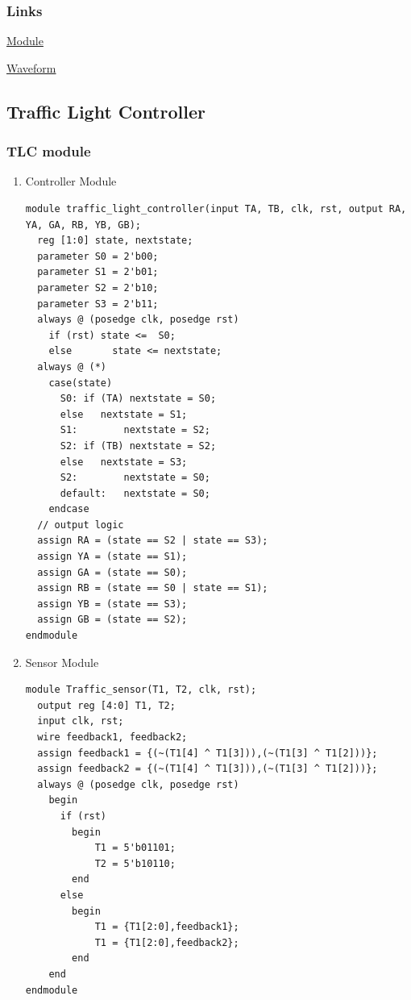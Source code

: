 \documentclass[11pt]{article}
\begin{document}
\subsubsection{Links}
\label{sec:org8eff037}

\href{https://www.edaplayground.com/x/3g3D}{Module}

\href{https://www.edaplayground.com/w/x/23g}{Waveform}
\subsection{Traffic Light Controller}
\label{sec:org4c664e3}
\subsubsection{TLC module}
\label{sec:orgbf96796}
\begin{enumerate}
\item Controller Module
\label{sec:orgc8b33d9}
\begin{verbatim}
module traffic_light_controller(input TA, TB, clk, rst, output RA, YA, GA, RB, YB, GB);
  reg [1:0] state, nextstate;
  parameter S0 = 2'b00;
  parameter S1 = 2'b01;
  parameter S2 = 2'b10;
  parameter S3 = 2'b11;
  always @ (posedge clk, posedge rst)
    if (rst) state <=  S0;
    else       state <= nextstate;
  always @ (*)
    case(state)
      S0: if (TA) nextstate = S0;
      else   nextstate = S1;
      S1:        nextstate = S2;
      S2: if (TB) nextstate = S2;
      else   nextstate = S3;
      S2:        nextstate = S0;
      default:   nextstate = S0;
    endcase
  // output logic
  assign RA = (state == S2 | state == S3);
  assign YA = (state == S1);
  assign GA = (state == S0);
  assign RB = (state == S0 | state == S1);
  assign YB = (state == S3);
  assign GB = (state == S2);
endmodule
\end{verbatim}
\item Sensor Module
\label{sec:orgf1755b3}
\begin{verbatim}
module Traffic_sensor(T1, T2, clk, rst);
  output reg [4:0] T1, T2;
  input clk, rst;
  wire feedback1, feedback2;
  assign feedback1 = {(~(T1[4] ^ T1[3])),(~(T1[3] ^ T1[2]))};
  assign feedback2 = {(~(T1[4] ^ T1[3])),(~(T1[3] ^ T1[2]))};
  always @ (posedge clk, posedge rst)
    begin
      if (rst)
        begin
            T1 = 5'b01101;
            T2 = 5'b10110;
        end
      else
        begin
            T1 = {T1[2:0],feedback1};
            T1 = {T1[2:0],feedback2};
        end
    end
endmodule
\end{verbatim}
\end{enumerate}
\end{document}
